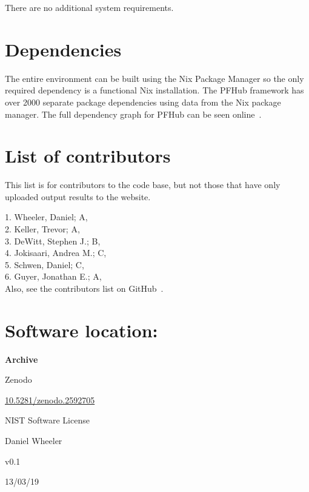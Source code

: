 \documentclass{jors}
\begin{document}
There are no additional system requirements.

\section*{Dependencies}

The entire environment can be built using the Nix Package Manager so
the only required dependency is a functional Nix installation. The
PFHub framework has over 2000 separate package dependencies using
data from the Nix package manager. The full dependency graph for PFHub
can be seen online~\cite{dependencies}.

\section*{List of contributors}

This list is for contributors to the code base, but not those that
have only uploaded output results to the website.

1. Wheeler, Daniel; A,  \\
2. Keller, Trevor; A,  \\
3. DeWitt, Stephen J.; B,  \\
4. Jokisaari, Andrea M.; C,  \\
5. Schwen, Daniel; C,  \\
6. Guyer, Jonathan E.; A,  \\

Also, see the contributors list on GitHub~\cite{contributors}.

\section*{Software location:}

{\bf Archive}

\begin{description}[noitemsep,topsep=0pt]
	\item[Name:] Zenodo
	\item[Persistent identifier:]
          \href{https://dx.doi.org/10.5281/zenodo.2592705}{10.5281/zenodo.2592705}
	\item[Licence:] NIST Software License~\cite{nistlicense}
	\item[Publisher:]  Daniel Wheeler
	\item[Version published:] v0.1
	\item[Date published:] 13/03/19
\end{description}
\end{document}
